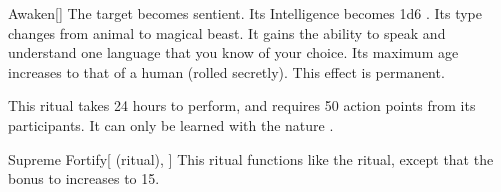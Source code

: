 \lowercase{\hypertarget{spell:Awaken}{}}\label{spell:Awaken}
\begin{apability}[Rank 6]{\hypertarget{spell:Awaken}{Awaken}}[]
The target becomes sentient.
Its Intelligence becomes 1d6 .
Its type changes from animal to magical beast.
It gains the ability to speak and understand one language that you know of your choice.
Its maximum age increases to that of a human (rolled secretly).
This effect is permanent.

This ritual takes 24 hours to perform, and requires 50 action points from its participants.
It can only be learned with the nature .
\end{apability}
\vspace{0.25em}



\lowercase{\hypertarget{spell:Supreme Fortify}{}}\label{spell:Supreme Fortify}
\begin{attuneability}[Rank 7]{\hypertarget{spell:Supreme Fortify}{Supreme Fortify}}[ (ritual), ]
This ritual functions like the  ritual, except that the bonus to  increases to 15.
\end{attuneability}
\vspace{0.25em}


